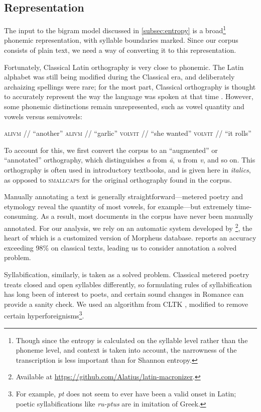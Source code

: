 \documentclass[12pt,twoside]{article}
\newcommand{\ipa}[1]{/\textipa{#1}/}
\begin{document}
\subsection{Representation}
\label{subsec:repr}

The input to the bigram model discussed in \ref{subsec:entropy} is a broad\footnote{Though since the entropy is calculated on the syllable level rather than the phoneme level, and context is taken into account, the narrowness of the transcription is less important than for Shannon entropy.} phonemic representation, with syllable boundaries marked. Since our corpus consists of plain text, we need a way of converting it to this representation.

Fortunately, Classical Latin orthography is very close to phonemic. The Latin alphabet was still being modified during the Classical era, and deliberately archaizing spellings were rare; for the most part, Classical orthography is thought to accurately represent the way the language was spoken at that time \citep[9]{allen}. However, some phonemic distinctions remain unrepresented, such as vowel quantity and vowels versus semivowels:

\begin{exe}
\ex \textsc{alivm} \ipa{a.li.um} ``another''
\ex \textsc{alivm} \ipa{a:.li.um} ``garlic''
\ex \textsc{volvit} \ipa{wo.lu.it} ``she wanted''
\ex \textsc{volvit} \ipa{wol.wit} ``it rolls''
\end{exe}

To account for this, we first convert the corpus to an ``augmented'' or ``annotated'' orthography, which distinguishes \emph{a} from \emph{\=a}, \emph{u} from \emph{v}, and so on. This orthography is often used in introductory textbooks, and is given here in \emph{italics}, as opposed to \textsc{smallcaps} for the original orthography found in the corpus.

Manually annotating a text is generally straightforward---metered poetry and etymology reveal the quantity of most vowels, for example---but extremely time-consuming. As a result, most documents in the corpus have never been manually annotated. For our analysis, we rely on an automatic system developed by \citet{winge}\footnote{Available at \url{https://github.com/Alatius/latin-macronizer}.}, the heart of which is a customized version of  Morpheus database. \citet[27]{winge} reports an accuracy exceeding 98\% on classical texts, leading us to consider annotation a solved problem.

Syllabification, similarly, is taken as a solved problem. Classical metered poetry treats closed and open syllables differently, so formulating rules of syllabification has long been of interest to poets, and certain sound changes in Romance can provide a sanity check. We used an algorithm from CLTK \citep{cltk}, modified to remove certain hyperforeignisms\footnote{For example, \emph{pt} does not seem to ever have been a valid onset in Latin; poetic syllabifications like \emph{ru-ptus} are in imitation of Greek.}.
\end{document}
